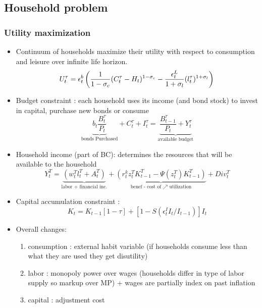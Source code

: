 \documentclass{article}
\begin{document}
\subsection{Household problem}

\subsubsection{Utility maximization}
\begin{itemize}
    \item Continuum of households maximize their utility with respect to consumption and leisure over infinite life horizon. 
    \begin{equation}
        U_t^{\tau} = \epsilon_t^b \left(\frac{1}{1-\sigma_c}(C_t^\tau-H_t)^{1-\sigma_c}-\frac{\epsilon_t^L}{1+\sigma_l}(l_t^\tau)^{1+\sigma_l} \right)\\
    \end{equation}
    \item Budget constraint : each household uses its income (and bond stock) to invest in capital, purchase new bonds or consume
    \begin{equation}
        \underbrace{b_t\frac{B_t^\tau}{P_t}}_{{}{\text{bonds Purchased}}}  + C_t^\tau +  I_t^\tau= \underbrace{\frac{B_{t-1}^\tau}{P_t} + Y_t^\tau}_{\text{available budget}}
    \end{equation}
    \item Household income (part of BC): determines the resources that will be available to the household 
    \begin{equation}
        Y_t^T = \underbrace{\left(w_t^T l_t^T + A_t^T\right)}_{\text{labor + financial inc.}} + \underbrace{\left(r_t^k z_t^T K_{t-1}^T - \Psi(z_t^T) K_{t-1}^T\right)}_{\text{benef - cost of $\nearrow$ utilization}} + Div_t^T  
    \end{equation}
    \item Capital accumulation constraint : 
    \begin{equation}
        K_t = K_{t-1}[1-\tau]+[1-S(\epsilon_t^II_t/I_{t-1})]I_t
    \end{equation}
    \item Overall changes: 
    \begin{enumerate}
        \item consumption : external habit variable (if households consume less than what they are used they get disutility) 
        \item labor : monopoly power over wages (households differ in type of labor supply so markup over MP) + wages are partially index on past inflation
        \item  capital : adjustment cost
    \end{enumerate}
\end{itemize}
\end{document}
